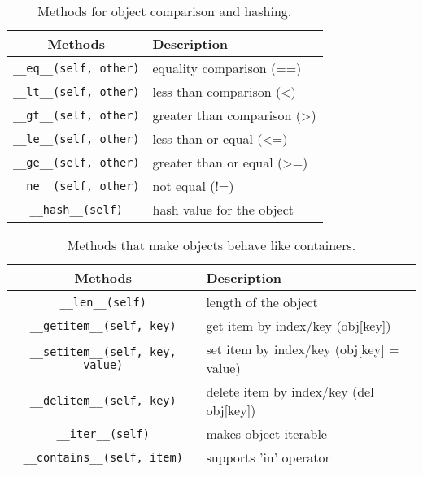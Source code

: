   \begin{definition}
    \begin{table}[H]
      \centering
      \begin{tabular}{|c|p{8cm}|}
        \hline
        \textbf{Methods} & \textbf{Description} \\
        \hline 
        \texttt{\_\_eq\_\_(self, other)} & equality comparison (==) \\
        \hline
        \texttt{\_\_lt\_\_(self, other)} & less than comparison (<) \\
        \hline
        \texttt{\_\_gt\_\_(self, other)} & greater than comparison (>) \\
        \hline
        \texttt{\_\_le\_\_(self, other)} & less than or equal (<=) \\
        \hline
        \texttt{\_\_ge\_\_(self, other)} & greater than or equal (>=) \\
        \hline
        \texttt{\_\_ne\_\_(self, other)} & not equal (!=) \\
        \hline
        \texttt{\_\_hash\_\_(self)} & hash value for the object \\
        \hline
      \end{tabular}
      \caption{Methods for object comparison and hashing.}
      \label{tab:comparison_hashing}
    \end{table}
  \end{definition}

  \begin{definition}
    \begin{table}[H]
      \centering
      \begin{tabular}{|c|p{8cm}|}
        \hline
        \textbf{Methods} & \textbf{Description} \\
        \hline 
        \texttt{\_\_len\_\_(self)} & length of the object \\
        \hline
        \texttt{\_\_getitem\_\_(self, key)} & get item by index/key (obj[key]) \\
        \hline
        \texttt{\_\_setitem\_\_(self, key, value)} & set item by index/key (obj[key] = value) \\
        \hline
        \texttt{\_\_delitem\_\_(self, key)} & delete item by index/key (del obj[key]) \\
        \hline
        \texttt{\_\_iter\_\_(self)} & makes object iterable \\
        \hline
        \texttt{\_\_contains\_\_(self, item)} & supports 'in' operator \\
        \hline
      \end{tabular}
      \caption{Methods that make objects behave like containers.}
      \label{tab:container_behavior}
    \end{table}
  \end{definition}

